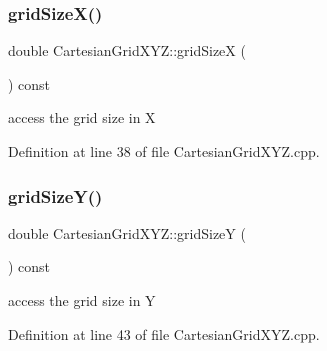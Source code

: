\hypertarget{class_d_d4hep_1_1_geometry_1_1_cartesian_grid_x_y_z_a91e442353457860559d3cc3ecc3c27dc}{}\label{class_d_d4hep_1_1_geometry_1_1_cartesian_grid_x_y_z_a91e442353457860559d3cc3ecc3c27dc} 
\subsubsection{\texorpdfstring{grid\+Size\+X()}{gridSizeX()}}
{\footnotesize\ttfamily double Cartesian\+Grid\+X\+Y\+Z\+::grid\+SizeX (\begin{DoxyParamCaption}{ }\end{DoxyParamCaption}) const}



access the grid size in X 



Definition at line 38 of file Cartesian\+Grid\+X\+Y\+Z.\+cpp.

\hypertarget{class_d_d4hep_1_1_geometry_1_1_cartesian_grid_x_y_z_a2ebbc72b0f29394770c8cb953cc615f5}{}\label{class_d_d4hep_1_1_geometry_1_1_cartesian_grid_x_y_z_a2ebbc72b0f29394770c8cb953cc615f5} 
\subsubsection{\texorpdfstring{grid\+Size\+Y()}{gridSizeY()}}
{\footnotesize\ttfamily double Cartesian\+Grid\+X\+Y\+Z\+::grid\+SizeY (\begin{DoxyParamCaption}{ }\end{DoxyParamCaption}) const}



access the grid size in Y 



Definition at line 43 of file Cartesian\+Grid\+X\+Y\+Z.\+cpp.

\hypertarget{class_d_d4hep_1_1_geometry_1_1_cartesian_grid_x_y_z_a2eafb3b4ed79a8487ce70f59d7deaac0}{}\label{class_d_d4hep_1_1_geometry_1_1_cartesian_grid_x_y_z_a2eafb3b4ed79a8487ce70f59d7deaac0} 
